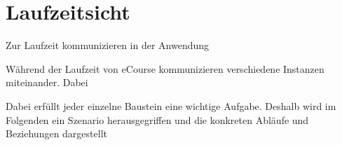 \chapter{Laufzeitsicht}
Zur Laufzeit kommunizieren in der Anwendung 

Während der Laufzeit von eCourse kommunizieren verschiedene Instanzen miteinander. 
Dabei 


Dabei erfüllt jeder einzelne Baustein eine wichtige Aufgabe. Deshalb wird 
im Folgenden ein Szenario herausgegriffen und die konkreten Abläufe und 
Beziehungen dargestellt